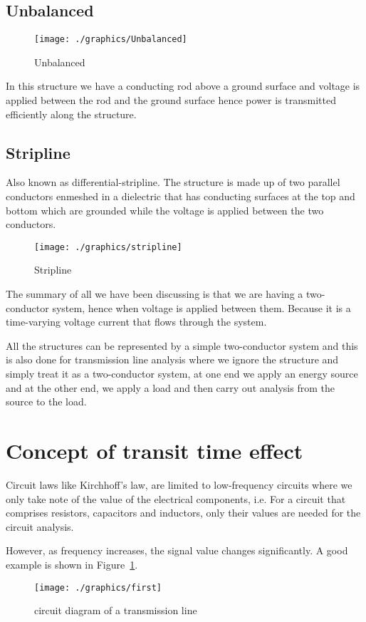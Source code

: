 \subsection{Unbalanced}
\begin{figure}[h]
\centering
\texttt{[image: ./graphics/Unbalanced]}
\caption{ Unbalanced }
\end{figure}
 In this structure we have a conducting rod above a ground surface and voltage is applied between the rod and the ground surface hence power is transmitted efficiently along the structure.
\subsection{Stripline} 
Also known as differential-stripline. The structure is made up of two parallel conductors enmeshed in a dielectric that has conducting surfaces at the top and bottom which are grounded while the voltage is applied between the two conductors.
\begin{figure}[h]
\centering
\texttt{[image: ./graphics/stripline]}
\caption{ Stripline}
\end{figure}

The summary of all we have been discussing is that we are having a two-conductor system, hence when voltage is applied between them. Because it is a time-varying voltage current that flows through the system.

All the structures can be represented by a simple two-conductor system and this is also done for transmission line analysis where we ignore the structure and simply treat it as a two-conductor system, at one end we apply an energy source and at the other end, we apply a load and then carry out analysis from the source to the load.

\section{Concept of transit time effect }
Circuit laws like Kirchhoff’s law, are limited to low-frequency circuits where we only take note of the value of the electrical components, i.e. For a circuit that comprises resistors, capacitors and inductors, only their values are needed for the circuit analysis.

However, as frequency increases, the signal value changes significantly. A good example is shown in Figure~\ref{fig:first}.

\begin{figure}[h]
\centering
\texttt{[image: ./graphics/first]}
\caption{circuit diagram of a transmission line}
\label{fig:first}
\end{figure}

